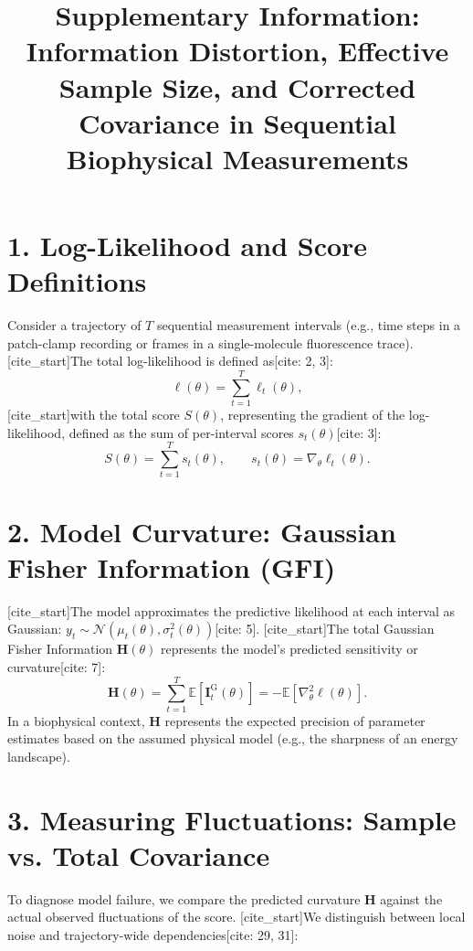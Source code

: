 \documentclass[11pt]{article}
\title{Supplementary Information: Information Distortion, Effective Sample Size, and Corrected Covariance in Sequential Biophysical Measurements}
\author{}
\date{}
\begin{document}
\maketitle

\section*{1. Log-Likelihood and Score Definitions}
Consider a trajectory of $T$ sequential measurement intervals (e.g., time steps in a patch-clamp recording or frames in a single-molecule fluorescence trace). [cite_start]The total log-likelihood is defined as[cite: 2, 3]:
\begin{equation}
\ell(\theta) = \sum_{t=1}^T \ell_t(\theta),
\end{equation}
[cite_start]with the total score $S(\theta)$, representing the gradient of the log-likelihood, defined as the sum of per-interval scores $s_t(\theta)$[cite: 3]:
\begin{equation}
S(\theta) = \sum_{t=1}^T s_t(\theta), \qquad s_t(\theta) = \nabla_\theta \ell_t(\theta).
\end{equation}

\section*{2. Model Curvature: Gaussian Fisher Information (GFI)}
[cite_start]The model approximates the predictive likelihood at each interval as Gaussian: $y_t \sim \mathcal{N}(\mu_t(\theta), \sigma_t^2(\theta))$[cite: 5]. [cite_start]The total Gaussian Fisher Information $\mathbf{H}(\theta)$ represents the model's predicted sensitivity or curvature[cite: 7]:
\begin{equation}
\mathbf{H}(\theta) = \sum_{t=1}^T \mathbb{E}\left[\mathbf{I}_t^{\mathrm{G}}(\theta)\right] = - \mathbb{E}\left[\nabla_\theta^2 \ell(\theta)\right].
\end{equation}
In a biophysical context, $\mathbf{H}$ represents the expected precision of parameter estimates based on the assumed physical model (e.g., the sharpness of an energy landscape).

\section*{3. Measuring Fluctuations: Sample vs. Total Covariance}
To diagnose model failure, we compare the predicted curvature $\mathbf{H}$ against the actual observed fluctuations of the score. [cite_start]We distinguish between local noise and trajectory-wide dependencies[cite: 29, 31]:
\end{document}
